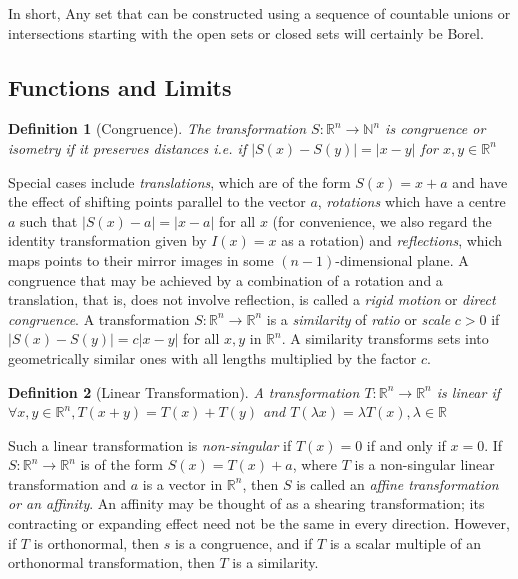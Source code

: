 \documentclass[12pt, a4paper]{article}
\newtheorem{definition}{Definition}[subsection]
\begin{document}
In short, Any set that can be constructed using a sequence of countable unions or intersections starting with the open sets or closed sets will certainly be Borel.

\subsection{Functions and Limits}

\begin{definition}[Congruence]
    The transformation $S : \mathbb{R}^n\rightarrow \mathbb{N}^n$ is congruence or isometry if it preserves distances i.e. if $|S(x)-S(y)| = |x-y|$ for $x, y\in \mathbb{R}^n$
    
\end{definition}

Special cases include \textit{translations}, which are of the form 
$S(x)=x+a$ and have the effect of shifting points parallel 
to the vector $a$, \textit{rotations} which have a centre $a$ such 
that $|S(x)-a|=|x-a|$ for all $x$ (for convenience, we also 
regard the identity transformation given by $I(x)=x$ as a 
rotation) and \textit{reflections}, which maps points to their mirror 
images in some $(n-1)$-dimensional plane. A congruence that 
may be achieved by a combination of a rotation and a translation, 
that is, does not involve reflection, is called a \textit{rigid motion} or 
\textit{direct congruence}. A transformation 
$S: \mathbb{R}^{n} \rightarrow \mathbb{R}^{n}$ is a \textit{similarity} of 
\textit{ratio} or \textit{scale} $c>0$ if $|S(x)-S(y)|=c|x-y|$ for all $x, y$ 
in $\mathbb{R}^{n} .$ A similarity transforms sets into geometrically 
similar ones with all lengths multiplied by the factor $c$.

\begin{definition}[Linear Transformation]
    A transformation $T : \mathbb{R}^n \rightarrow \mathbb{R}^n$ is linear 
    if $\forall x, y \in \mathbb{R}^n, T(x+y) = T(x) + T(y)$ and 
    $T(\lambda x) = \lambda T(x), \lambda \in\mathbb{R}$ 
\end{definition}

Such a linear transformation is \textit{non-singular} if $T(x)=0$ if and only if $x=0 .$ If 
$S: \mathbb{R}^{n} \rightarrow \mathbb{R}^{n}$ is of the form $S(x)=T(x)+a$, 
where $T$ is a non-singular linear transformation and $a$ is a vector in 
$\mathbb{R}^{n}$, then $S$ is called an \textit{affine transformation}\textit{ or an 
affinity}. An affinity may be thought of as a shearing transformation; 
its contracting or expanding effect need not be the same in every direction. 
However, if $T$ is orthonormal, then $s$ is a congruence, and if $T$ is a 
scalar multiple of an orthonormal transformation, then $T$ is a similarity.
\end{document}
